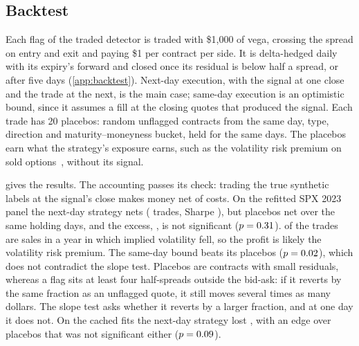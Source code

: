 \subsection{Backtest}

Each flag of the traded detector is traded with \$1{,}000 of vega, crossing the spread on entry and
exit and paying \$1 per contract per side. It is delta-hedged daily with its expiry's forward and
closed once its residual is below half a spread, or after five days (\cref{app:backtest}). Next-day
execution, with the signal at one close and the trade at the next, is the main case; same-day
execution is an optimistic bound, since it assumes a fill at the closing quotes that produced the
signal. Each trade has 20 placebos: random unflagged contracts from the same day, type, direction and
maturity--moneyness bucket, held for the same days. The placebos earn what the strategy's exposure
earns, such as the volatility risk premium on sold options~\citep{bakshi2003,carr2009}, without its
signal.

\begin{table}[t]
  \centering\small
  \caption{Delta-hedged backtest of the traded detector at margin 4, holding at most five days, with
  20 matched placebos per trade. Sharpe ratios are annualized from daily net PnL; ``placebo'' is the
  placebos' mean net and ``excess'' the strategy's net minus it, with a Newey--West $p$-value. The validation row
  is the cell chosen by the selection rule, so it is biased upward. The synthetic rows trade the
  one-year conditional detector; trading the true labels checks the accounting.}
  \label{tab:backtest}
  
\end{table}

 gives the results. The accounting passes its check: trading the true synthetic
labels at the signal's close makes money net of costs. On the refitted SPX 2023 panel the next-day
strategy nets \btNet{} (\btTrades{} trades, Sharpe \btSharpe), but placebos net \btPlacebo{} over the
same holding days, and the excess, \btExcess, is not significant ($p=0.31$). \btSold{} of the trades are
sales in a year in which implied volatility fell, so the profit is likely the volatility risk
premium. The same-day bound beats its placebos ($p=0.02$), which does not contradict the slope
test. Placebos are contracts with small residuals, whereas a flag sits at least four half-spreads
outside the bid-ask: if it reverts by the same fraction as an unflagged quote, it still moves several
times as many dollars. The slope test asks whether it reverts by a larger fraction, and at one day it
does not. On the cached fits the next-day strategy lost \btCachedNet{}, with an edge over placebos
that was not significant either ($p=0.09$).

